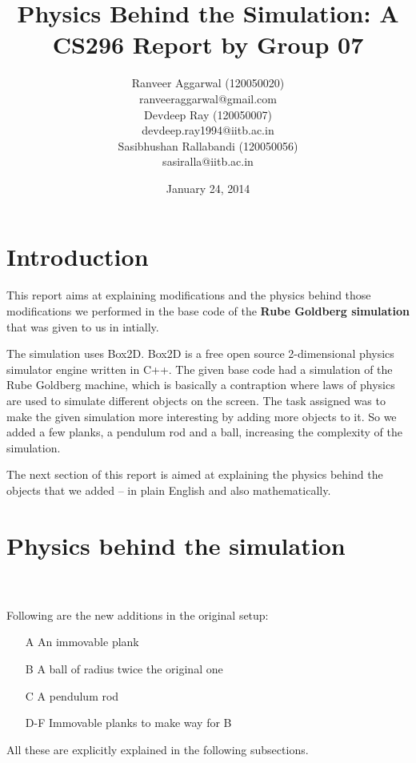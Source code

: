 \documentclass[11pt]{article}
\title{Physics Behind the Simulation: A CS296 Report by Group 07}
\author{Ranveer Aggarwal (120050020) \\ ranveeraggarwal@gmail.com \\ Devdeep Ray (120050007) \\ devdeep.ray1994@iitb.ac.in\\ Sasibhushan Rallabandi (120050056) \\ sasiralla@iitb.ac.in}
\date{January 24, 2014}
\begin{document}
\maketitle

\section{Introduction}
This report aims at explaining modifications and the physics behind those modifications we performed in the base code of the \textbf{Rube Goldberg simulation} that was given to us in intially.

The simulation uses Box2D. Box2D is a free open source 2-dimensional physics simulator engine written in C++. \cite{b2d} The given base code had a simulation of the Rube Goldberg machine, which is basically a contraption where laws of physics are used to simulate different objects on the screen. The task assigned was to make the given simulation more interesting by adding more objects to it. So we added a few planks, a pendulum rod and a ball, increasing the complexity of the simulation.

The next section of this report is aimed at explaining the physics behind the objects that we added -- in plain English and also mathematically.
\pagebreak

\section{Physics behind the simulation}

\setlength\fboxsep{2pt}
\setlength\fboxrule{1pt}
\\
\\
Following are the new additions in the original setup:
\begin{itemize}
\item[A] An immovable plank
\item[B] A ball of radius twice the original one
\item[C] A pendulum rod
\item[D-F] Immovable planks to make way for B
\end{itemize}
All these are explicitly explained in the following subsections.
\end{document}
